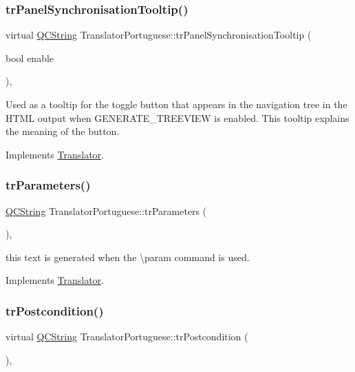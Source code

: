 \subsubsection{\texorpdfstring{trPanelSynchronisationTooltip()}{trPanelSynchronisationTooltip()}}
{\footnotesize\ttfamily virtual \mbox{\hyperlink{class_q_c_string}{Q\+C\+String}} Translator\+Portuguese\+::tr\+Panel\+Synchronisation\+Tooltip (\begin{DoxyParamCaption}\item[{bool}]{enable }\end{DoxyParamCaption})\hspace{0.3cm}{\ttfamily [inline]}, {\ttfamily [virtual]}}

Used as a tooltip for the toggle button that appears in the navigation tree in the H\+T\+ML output when G\+E\+N\+E\+R\+A\+T\+E\+\_\+\+T\+R\+E\+E\+V\+I\+EW is enabled. This tooltip explains the meaning of the button. 

Implements \mbox{\hyperlink{class_translator}{Translator}}.

\mbox{\label{class_translator_portuguese_a0f900080af87aa9264e9b220c8ef623e}} 
\subsubsection{\texorpdfstring{trParameters()}{trParameters()}}
{\footnotesize\ttfamily \mbox{\hyperlink{class_q_c_string}{Q\+C\+String}} Translator\+Portuguese\+::tr\+Parameters (\begin{DoxyParamCaption}{ }\end{DoxyParamCaption})\hspace{0.3cm}{\ttfamily [inline]}, {\ttfamily [virtual]}}

this text is generated when the \textbackslash{}param command is used. 

Implements \mbox{\hyperlink{class_translator}{Translator}}.

\mbox{\label{class_translator_portuguese_aadf8e6533da576d7a33745f35a2a68f2}} 
\subsubsection{\texorpdfstring{trPostcondition()}{trPostcondition()}}
{\footnotesize\ttfamily virtual \mbox{\hyperlink{class_q_c_string}{Q\+C\+String}} Translator\+Portuguese\+::tr\+Postcondition (\begin{DoxyParamCaption}{ }\end{DoxyParamCaption})\hspace{0.3cm}{\ttfamily [inline]}, {\ttfamily [virtual]}}

